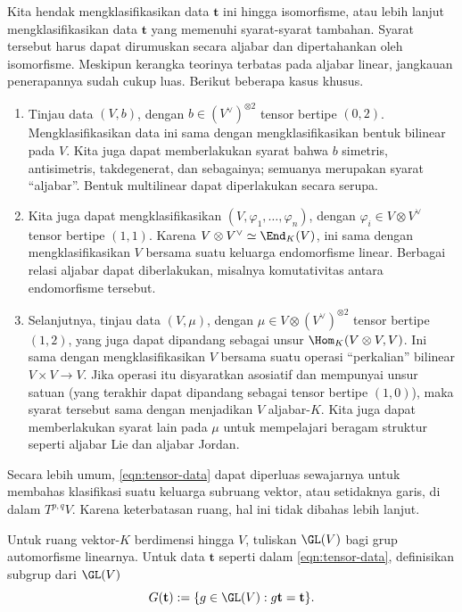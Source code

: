 Kita hendak mengklasifikasikan data $\mathbf{t}$ ini hingga isomorfisme,
atau lebih lanjut mengklasifikasikan data $\mathbf{t}$ yang memenuhi
syarat-syarat tambahan. Syarat tersebut harus dapat dirumuskan secara
aljabar dan dipertahankan oleh isomorfisme. Meskipun kerangka teorinya
terbatas pada aljabar linear, jangkauan penerapannya sudah cukup luas.
Berikut beberapa kasus khusus.
\begin{enumerate}
	\item Tinjau data $(V,b)$, dengan
	$b\in(V^\vee)^{\otimes2}$ tensor bertipe $(0,2)$. Mengklasifikasikan data
	ini sama dengan mengklasifikasikan bentuk bilinear pada $V$. Kita juga
	dapat memberlakukan syarat bahwa $b$ simetris, antisimetris, takdegenerat,
	dan sebagainya; semuanya merupakan syarat ``aljabar''. Bentuk multilinear
	dapat diperlakukan secara serupa.
	\item Kita juga dapat mengklasifikasikan
	$(V,\varphi_1,\ldots,\varphi_n)$, dengan
	$\varphi_i\in V\otimes V^\vee$ tensor bertipe $(1,1)$. Karena
	$V\otimes V^\vee\simeq\End_K(V)$, ini sama dengan mengklasifikasikan $V$
	bersama suatu keluarga endomorfisme linear. Berbagai relasi aljabar dapat
	diberlakukan, misalnya komutativitas antara endomorfisme tersebut.
	\item Selanjutnya, tinjau data $(V,\mu)$, dengan
	$\mu\in V\otimes(V^\vee)^{\otimes2}$ tensor bertipe $(1,2)$, yang juga
	dapat dipandang sebagai unsur $\Hom_K(V\otimes V,V)$. Ini sama dengan
	mengklasifikasikan $V$ bersama suatu operasi ``perkalian'' bilinear
	$V\times V\to V$. Jika operasi itu disyaratkan asosiatif dan mempunyai
	unsur satuan (yang terakhir dapat dipandang sebagai tensor bertipe
	$(1,0)$), maka syarat tersebut sama dengan menjadikan $V$ aljabar-$K$.
	Kita juga dapat memberlakukan syarat lain pada $\mu$ untuk mempelajari
	beragam struktur seperti aljabar Lie dan aljabar Jordan.
\end{enumerate}

Secara lebih umum, \eqref{eqn:tensor-data} dapat diperluas sewajarnya
untuk membahas klasifikasi suatu keluarga subruang vektor, atau setidaknya
garis, di dalam $T^{p,q}V$. Karena keterbatasan ruang, hal ini tidak dibahas
lebih lanjut.

\begin{definition}
	Untuk ruang vektor-$K$ berdimensi hingga $V$, tuliskan $\GL(V)$ bagi grup
	automorfisme linearnya. Untuk data $\mathbf{t}$ seperti dalam
	\eqref{eqn:tensor-data}, definisikan subgrup dari $\GL(V)$
	\[
	G(\mathbf{t}):=\{g\in\GL(V):g\mathbf{t}=\mathbf{t}\}.
	\]
\end{definition}

